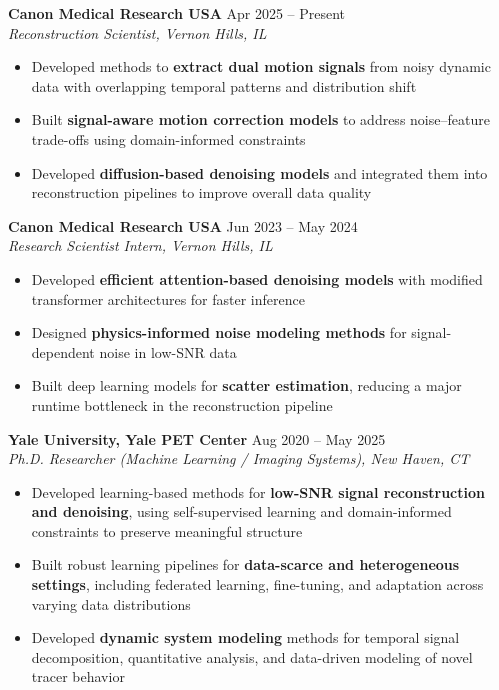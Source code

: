 \textbf{Canon Medical Research USA} \hfill Apr 2025 -- Present \\
\textit{Reconstruction Scientist, Vernon Hills, IL}
\begin{itemize}[leftmargin=*]
\item Developed methods to \textbf{extract dual motion signals} from noisy dynamic data with overlapping temporal patterns and distribution shift
\item Built \textbf{signal-aware motion correction models} to address noise--feature trade-offs using domain-informed constraints
\item Developed \textbf{diffusion-based denoising models} and integrated them into reconstruction pipelines to improve overall data quality
\end{itemize}

\textbf{Canon Medical Research USA} \hfill Jun 2023 -- May 2024 \\
\textit{Research Scientist Intern, Vernon Hills, IL}
\begin{itemize}[leftmargin=*]
\item Developed \textbf{efficient attention-based denoising models} with modified transformer architectures for faster inference
\item Designed \textbf{physics-informed noise modeling methods} for signal-dependent noise in low-SNR data
\item Built deep learning models for \textbf{scatter estimation}, reducing a major runtime bottleneck in the reconstruction pipeline
\end{itemize}

\textbf{Yale University, Yale PET Center} \hfill Aug 2020 -- May 2025 \\
\textit{Ph.D. Researcher (Machine Learning / Imaging Systems), New Haven, CT}
\begin{itemize}[leftmargin=*]
\item Developed learning-based methods for \textbf{low-SNR signal reconstruction and denoising}, using self-supervised learning and domain-informed constraints to preserve meaningful structure
\item Built robust learning pipelines for \textbf{data-scarce and heterogeneous settings}, including federated learning, fine-tuning, and adaptation across varying data distributions
\item Developed \textbf{dynamic system modeling} methods for temporal signal decomposition, quantitative analysis, and data-driven modeling of novel tracer behavior
\end{itemize}

